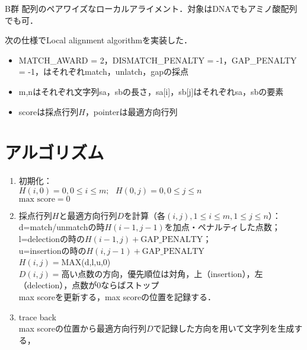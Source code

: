 \documentclass[a4paper,11pt]{jsarticle}
\numberwithin{theorem}{section}  %
\numberwithin{equation}{section} %
\begin{document}
{}
\renewcommand{\thepart}{\arabic{part}}


\begin{itembox}[l]{B群}
配列のペアワイズなローカルアライメント．対象はDNAでもアミノ酸配列でも可．
\end{itembox}
次の仕様でLocal alignment algorithmを実装した．
\begin{itemize}
\item MATCH\_AWARD = 2，DISMATCH\_PENALTY = -1，GAP\_PENALTY = -1，はそれぞれmatch，unlatch，gapの採点
\item m,nはそれぞれ文字列sa，sbの長さ，sa[i]，sb[j]はそれぞれsa，sbの要素
\item scoreは採点行列$H$，pointerは最適方向行列
\end{itemize}

\section{アルゴリズム}
\begin{enumerate}
\item 初期化：\\
$H(i,0)=0, 0 \le i \le m;\,\,\,\, H(0,j)=0, 0 \le j \le n$\\
$\text{max score}=0$
\item 採点行列$H$と最適方向行列$D$を計算（各$(i,j),1\le i\le m, 1\le j \le n $）：\\
d=match/unmatchの時$H(i-1,j-1)$を加点・ペナルティした点数；\\
l=delectionの時の$H(i-1,j)+\text{GAP\_PENALTY}$；\\
u=insertionの時の$H(i,j-1)+\text{GAP\_PENALTY}$\\
$H(i,j)=$MAX(d,l,u,0)\\
$D(i,j)=$高い点数の方向，優先順位は対角，上（insertion），左（delection），点数が0ならばストップ\\
max scoreを更新する，max scoreの位置を記録する．
\item trace back\\
max scoreの位置から最適方向行列$D$で記録した方向を用いて文字列を生成する，
\end{enumerate}
\end{document}
